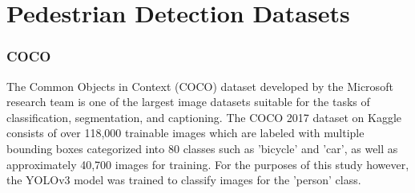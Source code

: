 \section{Pedestrian Detection Datasets}
\subsubsection{COCO}
The Common Objects in Context (COCO) dataset developed by the Microsoft research team is one of the largest image datasets suitable for the tasks of classification, segmentation, and captioning. The COCO 2017 dataset on Kaggle consists of over 118,000 trainable images which are labeled with multiple bounding boxes categorized into 80 classes such as 'bicycle' and 'car', as well as approximately 40,700 images for training. For the purposes of this study however, the YOLOv3 model was trained to classify images for the 'person' class.
